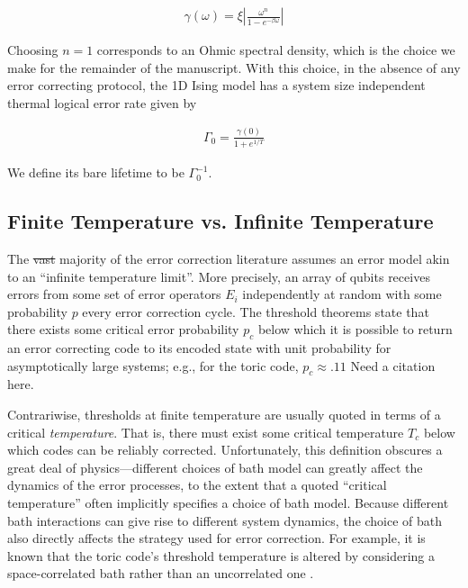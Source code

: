 \documentclass[twocolumn,superscriptaddress,aps,prb,floatfix]{revtex4-1}
\newcommand{\CMH}[1]{{\color{green} { #1}}}
\newcommand{\MS}[1]{{\color{mauve} {#1}}}
\begin{document}
\begin{align}
\gamma \left( \omega \right)=\xi \left  \vert \frac{\omega^n }{1-e^{-\beta \omega }} \right \vert \label{eq:gammadef}
\end{align}

Choosing $n=1$ corresponds to an Ohmic spectral density, which is the choice we make for the remainder of the manuscript.  With this choice, in the absence of any error correcting protocol, the 1D Ising model has a system size independent thermal \MS{logical} error rate given by\cite{Freeman2016}

\begin{align}
\Gamma_0 = \frac{\gamma(0)}{1+e^{1/T}} 
\end{align}

We define its bare lifetime to be $\Gamma_0^{-1}$.

\subsection{Finite Temperature vs. Infinite Temperature}
\label{sec:temperature}

 The \CMH{\sout{vast}} majority of the error correction literature assumes an error model akin to an ``infinite temperature limit''.  More precisely, an array of qubits receives errors from some set of error operators ${E_i}$ independently at random with some probability $p$ every error correction cycle.  The threshold theorems state that there exists some critical error probability $p_c$ below which it is possible to return an error correcting code to its encoded state with unit probability for asymptotically large systems; e.g., for the toric code, $p_c\approx.11$ \MS{Need a citation here}.
 
 Contrariwise, thresholds at finite temperature are usually quoted in terms of a critical \emph{temperature}.  That is, there must exist some critical temperature $T_c$ below which codes can be reliably corrected.  Unfortunately, this definition obscures a great deal of physics---different choices of bath model can greatly affect the dynamics of the error processes, to the extent that a quoted ``critical temperature'' often implicitly specifies a choice of bath model.  Because different bath interactions can give rise to different system dynamics, the choice of bath also directly affects the strategy used for error correction.  For example, it is known that the toric code's threshold temperature is altered by considering a space-correlated bath rather than an uncorrelated one \cite{Novais2013}.
 
\end{document}
